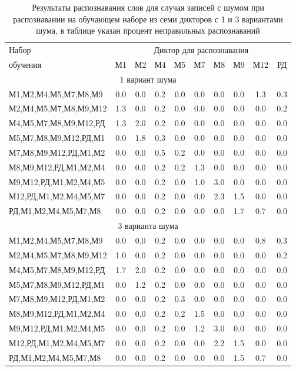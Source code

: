 \begin{table}[h]
	\centering
	\caption{Результаты распознавания слов для случая записей с шумом при распознавании на обучающем наборе из семи дикторов с 1 и 3 вариантами шума, в таблице указан процент неправильных распознаваний}
	\label{tab:cnn_3noise_7dictors}
	\begin{tabular}{| l | c | c | c | c | c | c | c | c | c |}
		\hline
		Набор & \multicolumn{9}{c|}{Диктор для распознавания} \\
		\hhline{~---------}
		обучения \phantom{0000000000000000000} & М1  & М2  & М4  & М5  & М7  & М8  & М9  & М12 & РД \\
		\hline
		\multicolumn{10}{|c|}{1 вариант шума} \\
		\hline
		М1,М2,М4,М5,М7,М8,М9  & 0.0 & 0.0 & 0.2 & 0.0 & 0.0 & 0.0 & 0.0 & 1.3 & 0.3 \\
		М2,М4,М5,М7,М8,М9,М12 & 1.3 & 0.0 & 0.2 & 0.0 & 0.0 & 0.0 & 0.0 & 0.0 & 0.2 \\
		М4,М5,М7,М8,М9,М12,РД & 1.3 & 2.0 & 0.2 & 0.0 & 0.0 & 0.0 & 0.0 & 0.0 & 0.0 \\
		М5,М7,М8,М9,М12,РД,М1 & 0.0 & 1.8 & 0.3 & 0.0 & 0.0 & 0.0 & 0.0 & 0.0 & 0.0 \\
		М7,М8,М9,М12,РД,М1,М2 & 0.0 & 0.0 & 0.5 & 0.2 & 0.0 & 0.0 & 0.0 & 0.0 & 0.0 \\
		М8,М9,М12,РД,М1,М2,М4 & 0.0 & 0.0 & 0.2 & 0.2 & 1.3 & 0.0 & 0.0 & 0.0 & 0.0 \\
		М9,М12,РД,М1,М2,М4,М5 & 0.0 & 0.0 & 0.2 & 0.0 & 1.0 & 3.0 & 0.0 & 0.0 & 0.0 \\
		М12,РД,М1,М2,М4,М5,М7 & 0.0 & 0.0 & 0.2 & 0.0 & 0.0 & 2.3 & 1.5 & 0.0 & 0.0 \\
		РД,М1,М2,М4,М5,М7,М8  & 0.0 & 0.0 & 0.2 & 0.0 & 0.0 & 0.0 & 1.7 & 0.7 & 0.0 \\	
		\hline
		\multicolumn{10}{|c|}{3 варианта шума} \\
		\hline
		М1,М2,М4,М5,М7,М8,М9  & 0.0 & 0.0 & 0.2 & 0.0 & 0.0 & 0.0 & 0.0 & 0.8 & 0.3 \\
		М2,М4,М5,М7,М8,М9,М12 & 1.0 & 0.0 & 0.2 & 0.0 & 0.0 & 0.0 & 0.0 & 0.0 & 0.2 \\
		М4,М5,М7,М8,М9,М12,РД & 1.7 & 2.0 & 0.2 & 0.0 & 0.0 & 0.0 & 0.0 & 0.0 & 0.0 \\
		М5,М7,М8,М9,М12,РД,М1 & 0.0 & 1.2 & 0.2 & 0.0 & 0.0 & 0.0 & 0.0 & 0.0 & 0.0 \\
		М7,М8,М9,М12,РД,М1,М2 & 0.0 & 0.0 & 0.2 & 0.3 & 0.0 & 0.0 & 0.0 & 0.0 & 0.0 \\
		М8,М9,М12,РД,М1,М2,М4 & 0.0 & 0.0 & 0.2 & 0.2 & 1.5 & 0.0 & 0.0 & 0.0 & 0.0 \\
		М9,М12,РД,М1,М2,М4,М5 & 0.0 & 0.0 & 0.2 & 0.0 & 1.2 & 3.0 & 0.0 & 0.0 & 0.0 \\
		М12,РД,М1,М2,М4,М5,М7 & 0.0 & 0.0 & 0.2 & 0.0 & 0.0 & 2.2 & 1.5 & 0.0 & 0.0 \\
		РД,М1,М2,М4,М5,М7,М8  & 0.0 & 0.0 & 0.2 & 0.0 & 0.0 & 0.0 & 1.5 & 0.7 & 0.0 \\
		\hline
	\end{tabular}
\end{table}

